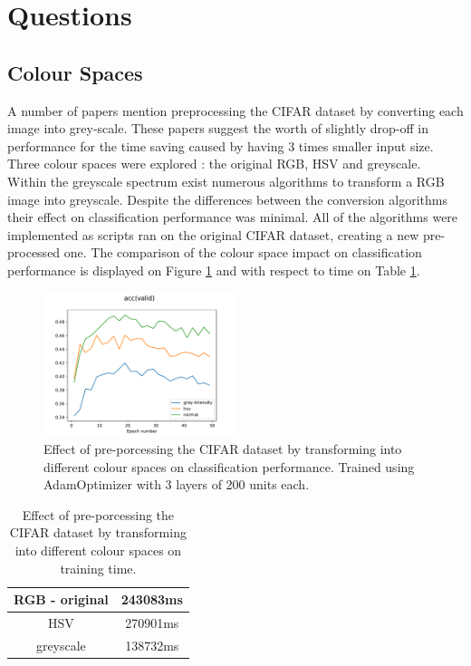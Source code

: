 \documentclass[12pt]{article}
\begin{document}
\section*{Questions}

\subsection*{Colour Spaces}

A number of papers mention preprocessing the CIFAR dataset by converting each image into grey-scale\cite{grey1}\cite{grey2}. These papers suggest the worth of slightly drop-off in performance for the time saving caused by having 3 times smaller input size. Three colour spaces were explored : the original RGB, HSV and greyscale. Within the greyscale spectrum exist numerous algorithms to transform a RGB image into greyscale\cite{grey3}. Despite the differences between the conversion algorithms their effect on classification performance was minimal. All of the algorithms were implemented as scripts ran on the original CIFAR dataset, creating a new pre-processed one. The comparison of the colour space impact on classification performance is displayed on Figure \ref{fig:colour} and with respect to time on Table \ref{tab:colour}.

\begin{figure}[H]
\centering
\includegraphics[width=0.5\textwidth]{colour_comp.pdf}

  \caption{Effect of pre-porcessing the CIFAR dataset by transforming into different colour spaces on classification performance. Trained using AdamOptimizer with 3 layers of 200 units each.}
  \label{fig:colour}
\end{figure}

\begin{table}[H]
\centering
\begin{tabular}[h]{| c | c |}
\hline
RGB - original &   243083ms\\
\hline
HSV &   270901ms\\
\hline
greyscale &   138732ms \\
\hline
\end{tabular} 
\caption{Effect of pre-porcessing the CIFAR dataset by transforming into different colour spaces on training time.}
\label{tab:colour}
\end{table}
\end{document}
